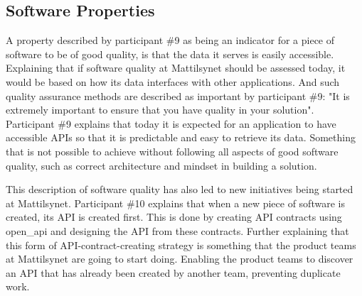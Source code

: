 

\subsection{Software Properties} \label{sec:software_properties}
A property described by participant \#9 as being an indicator for a piece of software to be of good quality, is that the data it serves is easily accessible. Explaining that if software quality at Mattilsynet should be assessed today, it would be based on how its data interfaces with other applications. And such quality assurance methods are described as important by participant \#9: "It is extremely important to ensure that you have quality in your solution". Participant \#9 explains that today it is expected for an application to have accessible APIs so that it is predictable and easy to retrieve its data. Something that is not possible to achieve without following all aspects of good software quality, such as correct architecture and mindset in building a solution. 


This description of software quality has also led to new initiatives being started at Mattilsynet. Participant \#10 explains that when a new piece of software is created, its API is created first. This is done by creating API contracts using \gls{open_api} and designing the API from these contracts. Further explaining that this form of API-contract-creating strategy is something that the product teams at Mattilsynet are going to start doing. Enabling the product teams to discover an API that has already been created by another team, preventing duplicate work.

